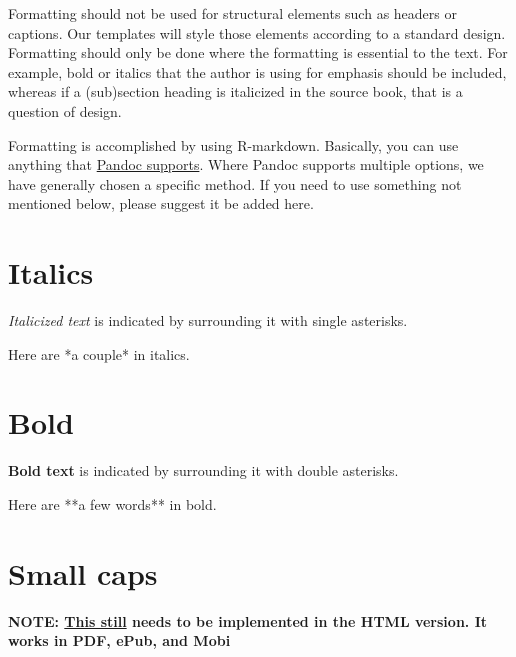 \documentclass[
  english,
]{book}
\newenvironment{Shaded}{\begin{snugshade}}{\end{snugshade}}
\newcommand{\NormalTok}[1]{#1}
\begin{document}
Formatting should not be used for structural elements such as headers or captions. Our templates will style those elements according to a standard design. Formatting should only be done where the formatting is essential to the text. For example, bold or italics that the author is using for emphasis should be included, whereas if a (sub)section heading is italicized in the source book, that is a question of design.

Formatting is accomplished by using R-markdown. Basically, you can use anything that \href{https://pandoc.org/MANUAL.html\#pandocs-markdown}{Pandoc supports}. Where Pandoc supports multiple options, we have generally chosen a specific method. If you need to use something not mentioned below, please suggest it be added here.

\hypertarget{italics}{%
\section{Italics}\label{italics}}

\emph{Italicized text} is indicated by surrounding it with single asterisks.

\begin{Shaded}
\begin{Highlighting}[]
\NormalTok{Here are *a couple* in italics.}
\end{Highlighting}
\end{Shaded}

\hypertarget{bold}{%
\section{Bold}\label{bold}}

\textbf{Bold text} is indicated by surrounding it with double asterisks.

\begin{Shaded}
\begin{Highlighting}[]
\NormalTok{Here are **a few words** in bold.}
\end{Highlighting}
\end{Shaded}

\hypertarget{small-caps}{%
\section{Small caps}\label{small-caps}}

\textbf{NOTE: \href{https://github.com/warhornmedia/classics-documentation/issues/3}{This still} needs to be implemented in the HTML version. It works in PDF, ePub, and Mobi}
\end{document}
